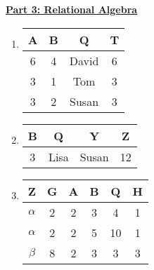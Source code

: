 \documentclass[12pt]{article}
\begin{document}
\newpage

\textbf{\underline{Part 3: Relational Algebra}}
\begin{enumerate}
\item 
    \begin{tabular}{|c|c|c|c|}
      \hline
      A & B & Q & T \\
      \hline 
      6 & 4 & David & 6 \\
      3 & 1 & Tom & 3 \\
      3 & 2 & Susan & 3 \\
      \hline
    \end{tabular}

\item
    \begin{tabular}{|c|c|c|c|}
      \hline
      B & Q & Y & Z \\
      \hline 
      3 & Lisa & Susan & 12 \\
      \hline
    \end{tabular}
\item
    \begin{tabular}{|c|c|c|c|c|c|}
      \hline
      Z & G & A & B & Q & H  \\
      \hline 
      $\alpha$ & 2 & 2 & 3 & 4 & 1 \\
      $\alpha$ & 2 & 2 & 5 & 10 & 1 \\
      $\beta$ & 8 & 2 & 3 & 3 & 3\\  
      \hline
    \end{tabular}
  

\end{enumerate}
\end{document}
